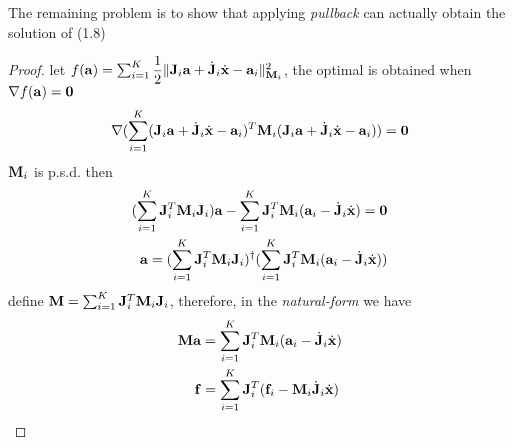 The remaining problem is to show that applying \textit{pullback} can actually obtain the solution of (1.8)

\begin{proof}
let $f(\mathbf{a}) = \sum_{i=1}^{K}\dfrac{1}{2}\|\mathbf{J}_i{\mathbf{a}}+\dot{\mathbf{J}}_i\dot{\mathbf{x}} - \mathbf{a}_i\|_{\mathbf{M}_i}^2$, the optimal is obtained when $\nabla f(\ab) = \0b$
\begin{align*}
\nabla(\sum_{i=1}^{K}(\Jb_i\ab+ \Jd_i\xd - \ab_i)^{T}\Mb_i(\Jb_i\ab+ \Jd_i\xd - \ab_i)) &= \0b \\
\end{align*}
$\mathbf{M}_i$ is p.s.d. then
\begin{align*}
(\sum_{i=1}^{K}\Jb_i^T\Mb_i\Jb_i)\ab - \sum_{i=1}^{K}\Jb_i^T\Mb_i(\ab_i - \Jd_i\xd) = \0b  \\
\ab = (\sum_{i=1}^{K}\Jb_i^T\Mb_i\Jb_i)^{\dagger}(\sum_{i=1}^{K}\Jb_i^T\Mb_i(\ab_i - \Jd_i\xd))
\end{align*}
define $\mathbf{M} = \sum_{i=1}^{K}\mathbf{J}_i^T\mathbf{M}_i\mathbf{J}_i$, therefore, in the \textit{natural-form} we have 
\begin{align*}
\mathbf{M}\mathbf{a} &= \sum_{i=1}^{K}\mathbf{J}_i^T\mathbf{M}_i(\mathbf{a}_i - {\dot{\mathbf{J}}}_i{\dot{\mathbf{x}}}) \\
\mathbf{f} &= \sum_{i=1}^{K}\mathbf{J}_i^T(\mathbf{f}_i - \mathbf{M}_i{\dot{\mathbf{J}}}_i{\dot{\mathbf{x}}})
\end{align*}

\end{proof}




%
%
